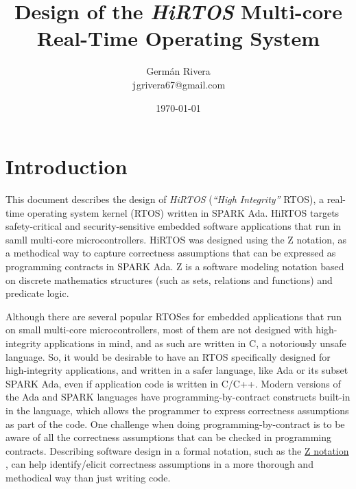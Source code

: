 \documentclass[11pt,letterpaper,twoside,openany]{book}
\begin{document}
\title{Design of the \emph{HiRTOS} Multi-core \\
       Real-Time Operating System}
\author{Germ\'an Rivera \\
        \texttt jgrivera67@gmail.com}
\date{\today}
\maketitle

\frontmatter
\tableofcontents

\mainmatter
\raggedbottom
\pagestyle{myheadings}

\chapter{Introduction}

This document describes the design of \emph{HiRTOS} (\emph{``High Integrity''} RTOS),
a real-time operating system kernel (RTOS) written in SPARK Ada. HiRTOS targets
safety-critical and security-sensitive embedded software applications that run
in samll multi-core microcontrollers. HiRTOS was designed using the Z notation,
as a methodical way to capture correctness assumptions that can be expressed
as programming contracts in SPARK Ada. Z is a software modeling notation based
on discrete mathematics structures (such as sets, relations and functions)
and predicate logic.

Although there are several popular RTOSes for embedded applications that run on small
multi-core microcontrollers, most of them are not designed with high-integrity applications
in mind, and as such are written in C, a notoriously unsafe language. So, it would be desirable
to have an RTOS specifically designed for high-integrity applications, and written in a safer
language, like Ada or its subset SPARK Ada, even if application code is written in C/C++.
Modern versions of the Ada and SPARK languages have programming-by-contract constructs built-in
in the language, which allows the programmer to express correctness assumptions as part of the
code. One challenge when doing programming-by-contract is to be aware of all the correctness
assumptions that can be checked in programming contracts. Describing software design in a formal
notation, such as the \href{http://en.wikipedia.org/wiki/Z_notation}{Z notation} \cite{Zrm, WayofZ},
can help identify/elicit correctness assumptions in a more thorough and methodical way than just
writing code.
\end{document}
